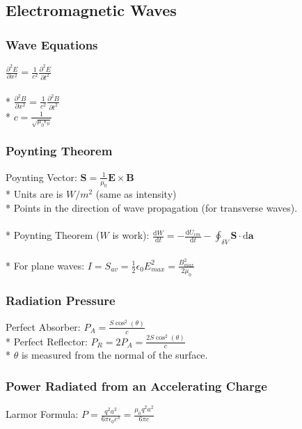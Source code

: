 \subsection{Electromagnetic Waves}

\subsubsection{Wave Equations}
\(\displaystyle\frac{\partial^2E}{\partial x^2}=\frac{1}{c^2}\frac{\partial^2E}{\partial t^2}\)\\\\*
\(\displaystyle\frac{\partial^2B}{\partial x^2}=\frac{1}{c^2}\frac{\partial^2B}{\partial t^2}\)\\*
\(\displaystyle c=\frac{1}{\sqrt{\mu_0\epsilon_0}}\)

\subsubsection{Poynting Theorem}
Poynting Vector: \(\mathbf{S}=\frac{1}{\mu_0}\mathbf{E}\times\mathbf{B}\)\\*
Units are is \(W/m^2\) (same as intensity)\\*
Points in the direction of wave propagation (for transverse waves).\\\\*
Poynting Theorem (\(W\) is work): \(\displaystyle \frac{\mathrm{d}W}{\mathrm{d}t}=-\frac{\mathrm{d}U_{em}}{\mathrm{d}t}-\oint_{\delta V}\mathbf{S}\cdot\mathrm{d}\mathbf{a}\)\\\\*
For plane waves: \(\displaystyle I=S_{av}=\frac{1}{2}\epsilon_0E_{max}^2=\frac{B_{max}^2}{2\mu_0}\)

\subsubsection{Radiation Pressure}
Perfect Absorber: \(\displaystyle P_A=\frac{S\cos^2(\theta)}{c}\)\\*
Perfect Reflector: \(\displaystyle P_R=2P_A=\frac{2S\cos^2(\theta)}{c}\)\\*
\(\theta\) is measured from the normal of the surface.

\subsubsection{Power Radiated from an Accelerating Charge}
Larmor Formula: \(\displaystyle P=\frac{q^2a^2}{6\pi\epsilon_0c^3}=\frac{\mu_0q^2a^2}{6\pi c}\)


